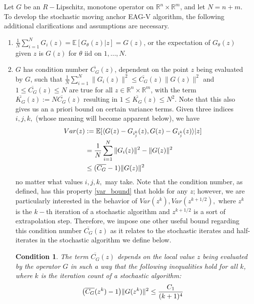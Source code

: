 \documentclass[11pt,reqno,oneside]{amsart}
\newtheorem{condition}[theorem]{Condition}
\theoremstyle{definition}
\numberwithin{equation}{section}
\begin{document}
Let $G$ be an $R-$Lipschitz, monotone operator on $\mathbb{R}^{n} \times \mathbb{R}^{m}$, and let $N=n+m.$
To develop the stochastic moving anchor EAG-V algorithm, the following additional clarifications and assumptions are necessary.
\begin{enumerate}
    \item $\displaystyle \frac{1}{N} \sum_{i=1}^{N}G_{i}(z) = \mathbb{E}[G_{\theta}(z) | z] = G(z)$, or the expectation of $G_{\theta}(z)$ given $z$ is $G(z)$ for $\theta$ iid on ${1,\ldots,N}.$ \label{condition1}
    \item $G$ has condition number $\overline{C_{G}}(z)$, dependent on the point $z$ being evaluated by $G$, such that $\displaystyle \frac{1}{N} \sum_{i=1}^{N} \|G_{i}(z)\|^{2} \leq  \overline{C_{G}}(z)\|G(z)\|^{2}$ and $1 \leq\overline{C_{G}}(z) \leq N$ are true for all $z \in \mathbb{R}^{n} \times \mathbb{R}^{m}$, with the term $\overline{K_{G}}(z) := N\overline{C_{G}}(z)$ resulting in $1 \leq \overline{K_{G}}(z) \leq N^{2}.$
    Note that this also gives us an a priori bound on certain variance terms.
    Given three indices $i, j, k,$ (whose meaning will become apparent below), we have
    \begin{align}
        Var(z) &:= \mathbb{E}[\langle G(z) - G_{i_{j}^{k}}(z), G(z) - G_{i_{j}^{k}}(z)\rangle | z] \notag \\
        &= \frac{1}{N} \sum_{i=1}^{N} \|G_{i}(z)\|^{2} - \|G(z)\|^{2} \notag \\
        &\leq (\overline{C_{G}} - 1)\|G(z)\|^{2} \label{var_bound}
    \end{align} 
    no matter what values $i, j, k,$ may take.
    Note that the condition number, as defined, has this property \eqref{var_bound} that holds for any $z$; however, we are particularly interested in the behavior of $Var(z^{k}), Var(z^{k+1/2}),$ where $z^{k}$ is the $k-$th iteration of a stochastic algorithm and $z^{k+1/2}$ is a sort of extrapolation step.
    Therefore, we impose one other useful bound regarding this condition number $\overline{C_{G}}(z)$ as it relates to the stochastic iterates and half-iterates in the stochastic algorithm we define below.
    \begin{condition} \label{summability_condition}
    The term $\overline{C_{G}}(z)$ depends on the local value $z$ being evaluated by the operator $G$ in such a way that the following inequalities hold for all $k$, where $k$ is the iteration count of a stochastic algorithm:
    \begin{align}
        \big{(}\overline{C_{G}}(z^{k})-1\big{)}\|G(z^{k})\|^{2} &\leq \frac{C_{1}}{(k+1)^{4}} \label{summ_cond_1} \\

\end{align}
\end{condition}
\end{enumerate}
\end{document}
